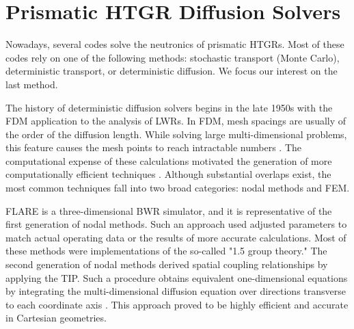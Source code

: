 \section{Prismatic HTGR Diffusion Solvers}

Nowadays, several codes solve the neutronics of prismatic \glspl{HTGR}.
Most of these codes rely on one of the following methods: stochastic transport (Monte Carlo), deterministic transport, or deterministic diffusion.
We focus our interest on the last method.

The history of deterministic diffusion solvers begins in the late 1950s with the \gls{FDM} application to the analysis of \glspl{LWR}.
In \gls{FDM}, mesh spacings are usually of the order of the diffusion length.
While solving large multi-dimensional problems, this feature causes the mesh points to reach intractable numbers \cite{lewis_finite_1986}.
The computational expense of these calculations motivated the generation of more computationally efficient techniques \cite{lawrence_progress_1986}.
Although substantial overlaps exist, the most common techniques fall into two broad categories: nodal methods and \gls{FEM}.

FLARE \cite{delp_flare_1964} is a three-dimensional \gls{BWR} simulator, and it is representative of the first generation of nodal methods.
Such an approach used adjusted parameters to match actual operating data or the results of more accurate calculations.
Most of these methods were implementations of the so-called "1.5 group theory."
The second generation of nodal methods derived spatial coupling relationships by applying the \gls{TIP}.
Such a procedure obtains equivalent one-dimensional equations by integrating the multi-dimensional diffusion equation over directions transverse to each coordinate axis \cite{lawrence_progress_1986}.
This approach proved to be highly efficient and accurate in Cartesian geometries.

